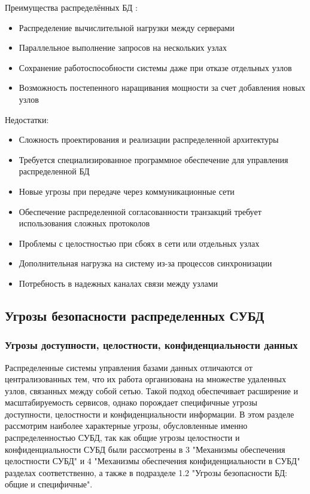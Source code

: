 Преимущества распределённых БД \autocite{DDBMSIndusEdition}:

\begin{itemize}
    \item Распределение вычислительной нагрузки между серверами
    \item Параллельное выполнение запросов на нескольких узлах
    \item Сохранение работоспособности системы даже при отказе отдельных узлов
    \item Возможность постепенного наращивания мощности за счет добавления новых узлов  
\end{itemize}

Недостатки:

\begin{itemize}
        \item Сложность проектирования и реализации распределенной архитектуры
        \item Требуется специализированное программное обеспечение для управления распределенной БД
        \item Новые угрозы при передаче через коммуникационные сети
        \item Обеспечение распределенной согласованности транзакций требует использования сложных протоколов
        \item Проблемы с целостностью при сбоях в сети или отдельных узлах
        \item Дополнительная нагрузка на систему из-за процессов синхронизации
        \item Потребность в надежных каналах связи между узлами
\end{itemize}

\subsection{Угрозы безопасности распределенных СУБД}

\subsubsection{Угрозы доступности, целостности, конфиденциальности данных}
\label{threats}
Распределенные системы управления базами данных отличаются от централизованных тем, что их работа организована на множестве удаленных узлов, 
связанных между собой сетью. Такой подход обеспечивает расширение и масштабируемость сервисов, однако порождает специфичные угрозы доступности, 
целостности и конфиденциальности информации. В этом разделе рассмотрим наиболее характерные угрозы, обусловленные именно распределенностью СУБД, 
так как общие угрозы целостности и конфиденциальности СУБД были рассмотрены в 3 "Механизмы обеспечения целостности СУБД" и 4 "Механизмы обеспечения конфиденциальности в СУБД"  разделах соответственно, а также в подразделе 1.2 "Угрозы безопасности БД: общие и специфичные".

